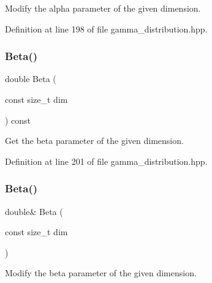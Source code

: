 Modify the alpha parameter of the given dimension. 



Definition at line 198 of file gamma\+\_\+distribution.\+hpp.

\mbox{\label{classmlpack_1_1distribution_1_1GammaDistribution_a4a58618c95fbb488db0201f02d722d17}} 
\subsubsection{Beta()\hspace{0.1cm}{\footnotesize\ttfamily [1/2]}}
{\footnotesize\ttfamily double Beta (\begin{DoxyParamCaption}\item[{const size\+\_\+t}]{dim }\end{DoxyParamCaption}) const\hspace{0.3cm}{\ttfamily [inline]}}



Get the beta parameter of the given dimension. 



Definition at line 201 of file gamma\+\_\+distribution.\+hpp.

\mbox{\label{classmlpack_1_1distribution_1_1GammaDistribution_aca929e6fd58776c990e0a59545283e4f}} 
\subsubsection{Beta()\hspace{0.1cm}{\footnotesize\ttfamily [2/2]}}
{\footnotesize\ttfamily double\& Beta (\begin{DoxyParamCaption}\item[{const size\+\_\+t}]{dim }\end{DoxyParamCaption})\hspace{0.3cm}{\ttfamily [inline]}}



Modify the beta parameter of the given dimension. 



